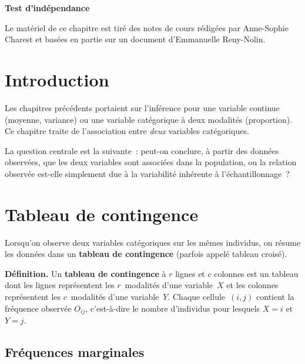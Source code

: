 \documentclass[11pt,french]{article}
\begin{document}
\begin{center}
  {\LARGE\bfseries Test d'indépendance}
\end{center}

\medskip
\begin{center}
\small{Le matériel de ce chapitre est tiré des notes de cours rédigées par Anne-Sophie Charest et basées en partie sur un document d'Emmanuelle Reny-Nolin.}
\end{center}

\bigskip
\tableofcontents

\newpage

\section{Introduction}

Les chapitres précédents portaient sur l'inférence pour une variable continue (moyenne,
variance) ou une variable catégorique à deux modalités (proportion). Ce chapitre traite de
l'association entre \emph{deux} variables catégoriques.

La question centrale est la suivante~: peut-on conclure, à partir des données observées,
que les deux variables sont associées dans la population, ou la relation observée est-elle
simplement due à la variabilité inhérente à l'échantillonnage~?

\section{Tableau de contingence}

Lorsqu'on observe deux variables catégoriques sur les mêmes individus, on résume les données
dans un \textbf{tableau de contingence} (parfois appelé tableau croisé).

\textbf{Définition.} Un \textbf{tableau de contingence} à $r$ lignes et $c$ colonnes est un
tableau dont les lignes représentent les $r$~modalités d'une variable~$X$ et les colonnes
représentent les $c$~modalités d'une variable~$Y$. Chaque cellule~$(i,j)$ contient la
fréquence observée $O_{ij}$, c'est-à-dire le nombre d'individus pour lesquels $X = i$ et
$Y = j$.

\subsection{Fréquences marginales}
\end{document}
